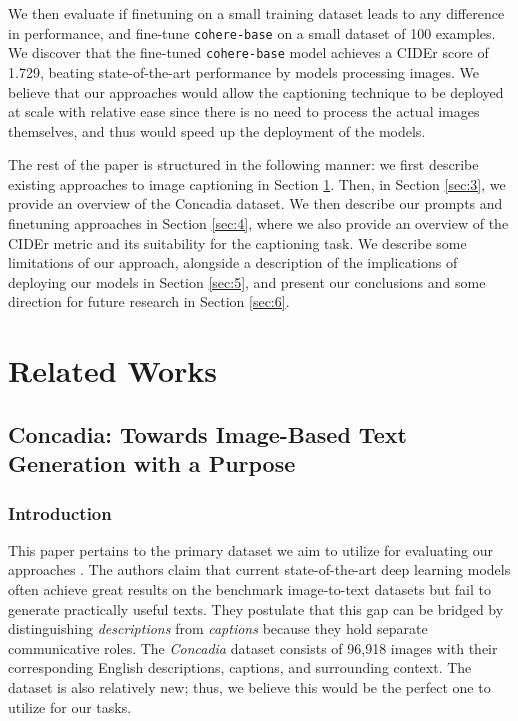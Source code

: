 \documentclass[11pt]{article}
\begin{document}
We then evaluate if finetuning on a small training dataset leads to any difference in performance, and fine-tune \texttt{cohere-base} on a small dataset of 100 examples. We discover that the fine-tuned \texttt{cohere-base} model achieves a CIDEr score of 1.729, beating state-of-the-art performance by models processing images. We believe that our approaches would allow the captioning technique to be deployed at scale with relative ease since there is no need to process the actual images themselves, and thus would speed up the deployment of the models.

The rest of the paper is structured in the following manner: we first describe existing approaches to image captioning in Section \ref{sec:2}. Then, in Section \ref{sec:3}, we provide an overview of the Concadia dataset. We then describe our prompts and finetuning approaches in Section \ref{sec:4}, where we also provide an overview of the CIDEr metric and its suitability for the captioning task. We describe some limitations of our approach, alongside a description of the implications of deploying our models in Section \ref{sec:5}, and present our conclusions and some direction for future research in Section \ref{sec:6}.

\section{Related Works}
\label{sec:2}

\subsection{Concadia: Towards Image-Based Text Generation with a Purpose}

\subsubsection{Introduction}
This paper pertains to the primary dataset we aim to utilize for evaluating our approaches \citep{kreiss2021concadia}. The authors claim that current state-of-the-art deep learning models often achieve great results on the benchmark image-to-text datasets but fail to generate practically useful texts. They postulate that this gap can be bridged by distinguishing \textit{descriptions} from \textit{captions} because they hold separate communicative roles. The \textit{Concadia} dataset consists of 96,918 images with their corresponding English descriptions, captions, and surrounding context. The dataset is also relatively new; thus, we believe this would be the perfect one to utilize for our tasks.
\end{document}
